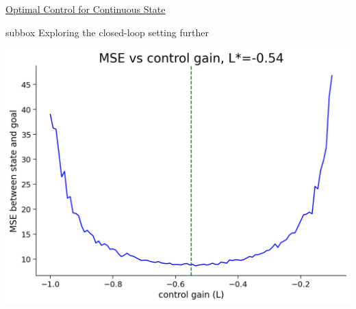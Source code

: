 \begin{textbox}{\href{https://compneuro.neuromatch.io/tutorials/W3D3_OptimalControl/student/W3D3_Tutorial2.html}{Optimal Control for Continuous State}}
\begin{subbox}{subbox}{ Exploring the closed-loop setting further }
\begin{center}
    
\includegraphics[scale=0.2]{Figures/OC/OC_Figure7.png}
\end{center}

\end{subbox}
\end{textbox}
